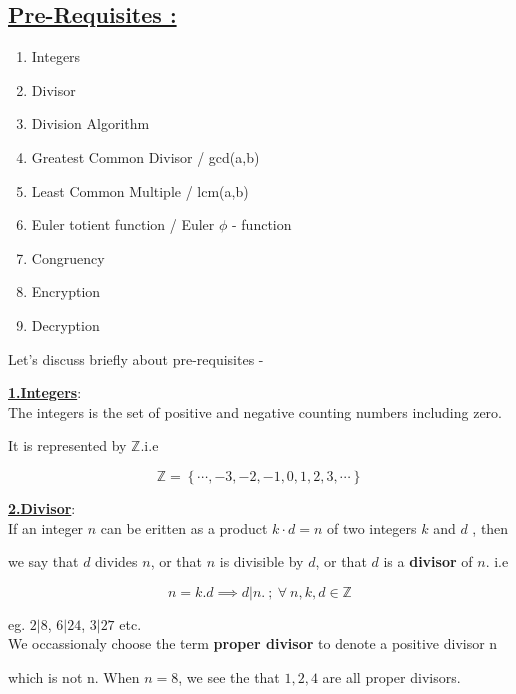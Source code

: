 \documentclass[12pt,a4paper]{article}
\begin{document}
    \subsection*{\underline{Pre-Requisites :}}
    \begin{enumerate}
        \item Integers
        \item Divisor
        \item Division Algorithm
        \item Greatest Common Divisor / gcd(a,b)
        \item Least Common Multiple / lcm(a,b)
        \item Euler totient function / Euler $\phi$ - function
        \item Congruency
        \item Encryption
        \item Decryption
    \end{enumerate}

    Let's discuss briefly about pre-requisites -

    \begin{tcolorbox}
        \underline{\bf{1.Integers}}:\\

        The integers is the set of positive and negative counting numbers including zero.
    
        It is represented by $\mathbb{Z}$.i.e
    
        $$\mathbb{Z} = \left\{\cdots, -3, -2, -1, 0, 1, 2, 3, \cdots\right\}$$
    
        \underline{\bf{2.Divisor}}:\\
    
        If an integer $n$ can be eritten as a product $k\cdot d = n$ of two integers $k$ and $d$ , then
        
        we say that $d$ divides $n$, or that $n$ is divisible by $d$, or that $d$ is a \textbf{divisor} of $n$. i.e
    
        $$n = k.d \implies d|n. \ ;\ \forall\ n,k,d \in \mathbb{Z} $$
    
        eg. $2|8$, $6|24$, $3|27$ etc.\\
    
    
        We occassionaly choose the term {\bf proper divisor} to denote a positive divisor n 
        
        which is not n. When $n = 8$, we see the that $1, 2, 4$ are all proper divisors.
    \end{tcolorbox}    
    
\end{document}
